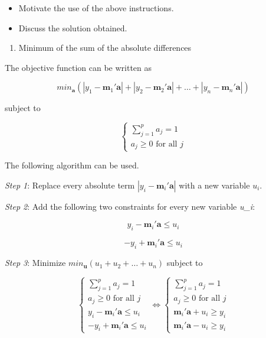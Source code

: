 \documentclass[
]{book}
\providecommand{\tightlist}{%
  \setlength{\itemsep}{0pt}\setlength{\parskip}{0pt}}
\begin{document}
\begin{itemize}
\item
  Motivate the use of the above instructions.
\item
  Discuss the solution obtained.
\end{itemize}

\begin{enumerate}
\def\labelenumi{(\roman{enumi})}
\setcounter{enumi}{1}
\tightlist
\item
  Minimum of the sum of the absolute differences
\end{enumerate}

The objective function can be written as

\[
min_\mathbf{a} \left( |y_1-\mathbf{m}_1'\mathbf{a}| + |y_2-\mathbf{m}_2'\mathbf{a}| + \dots + |y_n-\mathbf{m}_n'\mathbf{a}|    \right)
\]

subject to

\[
\left\{
\begin{array}{ll}
\sum_{j=1}^{p}{a_j} = 1\\
a_j \ge 0 \text{ for all } j
\end{array}
\right.
\]

The following algorithm can be used.

\emph{Step 1}: Replace every absolute term \(|y_i-\mathbf{m}_i'\mathbf{a}|\) with a new variable \(u_i\).

\emph{Step 2}: Add the following two constraints for every new variable \emph{u\_i}:

\[
y_i - \mathbf{m}_i'\mathbf{a} \le u_i
\]

\[
-y_i + \mathbf{m}_i'\mathbf{a} \le u_i
\]

\emph{Step 3}: Minimize \(min_\mathbf{u}(u_1+u_2+\dots+u_n)\) subject to

\[
\left\{
\begin{array}{ll}
\sum_{j=1}^{p}{a_j} = 1\\
a_j \ge 0 \text{ for all } j\\
y_i - \mathbf{m}_i'\mathbf{a} \le u_i\\
-y_i + \mathbf{m}_i'\mathbf{a} \le u_i
\end{array}
\right.
\Leftrightarrow
\left\{
\begin{array}{ll}
\sum_{j=1}^{p}{a_j} = 1\\
a_j \ge 0 \text{ for all } j\\
\mathbf{m}_i'\mathbf{a} + u_i \ge y_i\\
\mathbf{m}_i'\mathbf{a} - u_i \ge y_i
\end{array}
\right.
\]
\end{document}
